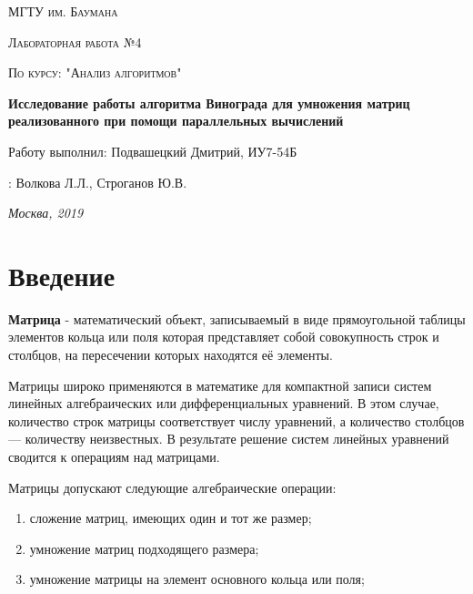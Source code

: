 \documentclass[12pt]{report}
\begin{document}
	
	\begin{titlepage}
		\centering
		{\scshape\LARGE МГТУ им. Баумана \par}
		\vspace{3cm}
		{\scshape\Large Лабораторная работа №4\par}
		\vspace{0.5cm}	
		{\scshape\Large По курсу: "Анализ алгоритмов"\par}
		\vspace{1.5cm}
		{\huge\bfseries Исследование работы алгоритма Винограда для умножения матриц реализованного при помощи параллельных вычислений\par}
		\vspace{2cm}
		\Large Работу выполнил: Подвашецкий Дмитрий, ИУ7-54Б\par
		\vspace{0.5cm}
		:  Волкова Л.Л., Строганов Ю.В.\par
		
		\vfill
		\large \textit {Москва, 2019} \par
	\end{titlepage}
	
	\tableofcontents
	
	\newpage
	\chapter*{Введение}
	
	\textbf{Матрица} - математический объект, записываемый в виде прямоугольной таблицы элементов кольца или поля которая представляет собой совокупность строк и столбцов, на пересечении которых находятся её элементы.
	
	Матрицы широко применяются в математике для компактной записи систем линейных алгебраических или дифференциальных уравнений. В этом случае, количество строк матрицы соответствует числу уравнений, а количество столбцов — количеству неизвестных. В результате решение систем линейных уравнений сводится к операциям над матрицами.
	
	Матрицы допускают следующие алгебраические операции:
	\begin{enumerate}
		\item сложение матриц, имеющих один и тот же размер;
		\item умножение матриц подходящего размера;
		\item умножение матрицы на элемент основного кольца или поля;
	\end{enumerate}
	
\end{document}
